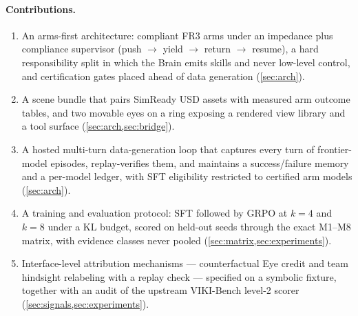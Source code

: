 \paragraph{Contributions.}
\begin{enumerate}[leftmargin=*,itemsep=1pt]
\item An arms-first architecture: compliant FR3 arms under an impedance plus compliance supervisor (push $\to$ yield $\to$ return $\to$ resume), a hard responsibility split in which the Brain emits skills and never low-level control, and certification gates placed ahead of data generation  (\cref{sec:arch}).
\item A scene bundle that pairs SimReady USD assets with measured arm outcome tables, and two movable eyes on a ring exposing a rendered view library and a tool surface  (\cref{sec:arch,sec:bridge}).
\item A hosted multi-turn data-generation loop that captures every turn of frontier-model episodes, replay-verifies them, and maintains a success/failure memory and a per-model ledger, with SFT eligibility restricted to certified arm models  (\cref{sec:arch}).
\item A training and evaluation protocol: SFT followed by GRPO at $k=4$ and $k=8$ under a KL budget, scored on held-out seeds through the exact M1--M8 matrix, with evidence classes never pooled  (\cref{sec:matrix,sec:experiments}).
\item Interface-level attribution mechanisms --- counterfactual Eye credit and team hindsight relabeling with a replay check --- specified on a symbolic fixture, together with an audit of the upstream VIKI-Bench level-2 scorer  (\cref{sec:signals,sec:experiments}).
\end{enumerate}

